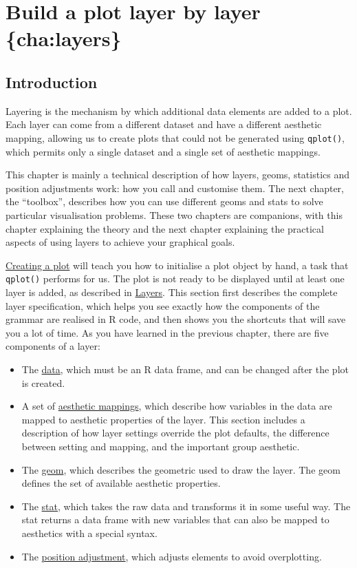 \chapter{Build a plot layer by layer \{cha:layers\}}

\section{Introduction}

Layering is the mechanism by which additional data elements are added to
a plot. Each layer can come from a different dataset and have a
different aesthetic mapping, allowing us to create plots that could not
be generated using \texttt{qplot()}, which permits only a single dataset
and a single set of aesthetic mappings.

This chapter is mainly a technical description of how layers, geoms,
statistics and position adjustments work: how you call and customise
them. The next chapter, the ``toolbox'', describes how you can use
different geoms and stats to solve particular visualisation problems.
These two chapters are companions, with this chapter explaining the
theory and the next chapter explaining the practical aspects of using
layers to achieve your graphical goals.

\hyperref[sec:ggplot]{Creating a plot} will teach you how to initialise
a plot object by hand, a task that \texttt{qplot()} performs for us. The
plot is not ready to be displayed until at least one layer is added, as
described in \hyperref[sec:layers]{Layers}. This section first describes
the complete layer specification, which helps you see exactly how the
components of the grammar are realised in R code, and then shows you the
shortcuts that will save you a lot of time. As you have learned in the
previous chapter, there are five components of a layer:

\begin{itemize}
\itemsep1pt\parskip0pt
\item
  The \hyperref[sec:data]{data}, which must be an R data frame, and can
  be changed after the plot is created.
\item
  A set of \hyperref[sec:aes]{aesthetic mappings}, which describe how
  variables in the data are mapped to aesthetic properties of the layer.
  This section includes a description of how layer settings override the
  plot defaults, the difference between setting and mapping, and the
  important group aesthetic.
\item
  The \hyperref[sec:geom]{geom}, which describes the geometric used to
  draw the layer. The geom defines the set of available aesthetic
  properties.
\item
  The \hyperref[sec:stat]{stat}, which takes the raw data and transforms
  it in some useful way. The stat returns a data frame with new
  variables that can also be mapped to aesthetics with a special syntax.
\item
  The \hyperref[sec:position]{position adjustment}, which adjusts
  elements to avoid overplotting.
\end{itemize}


